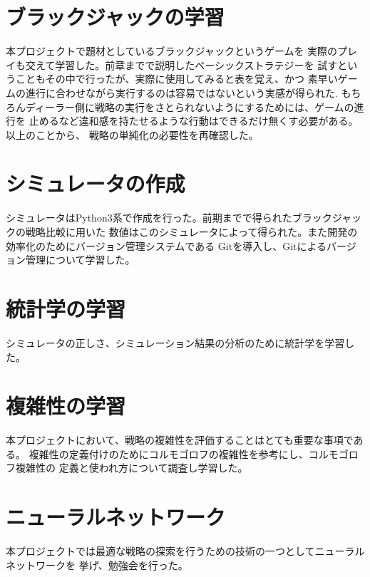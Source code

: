 \section{ブラックジャックの学習}
本プロジェクトで題材としているブラックジャックというゲームを
実際のプレイも交えて学習した。前章までで説明したベーシックストラテジーを
試すということもその中で行ったが、実際に使用してみると表を覚え、かつ
素早いゲームの進行に合わせながら実行するのは容易ではないという実感が得られた.
もちろんディーラー側に戦略の実行をさとられないようにするためには、ゲームの進行を
止めるなど違和感を持たせるような行動はできるだけ無くす必要がある。以上のことから、
戦略の単純化の必要性を再確認した。

\section{シミュレータの作成}
シミュレータはPython3系で作成を行った。前期までで得られたブラックジャックの戦略比較に用いた
数値はこのシミュレータによって得られた。また開発の効率化のためにバージョン管理システムである
Gitを導入し、Gitによるバージョン管理について学習した。

\section{統計学の学習}
シミュレータの正しさ、シミュレーション結果の分析のために統計学を学習した。

\section{複雑性の学習}
本プロジェクトにおいて、戦略の複雑性を評価することはとても重要な事項である。
複雑性の定義付けのためにコルモゴロフの複雑性を参考にし、コルモゴロフ複雑性の
定義と使われ方について調査し学習した。

\section{ニューラルネットワーク}
本プロジェクトでは最適な戦略の探索を行うための技術の一つとしてニューラルネットワークを
挙げ、勉強会を行った。

